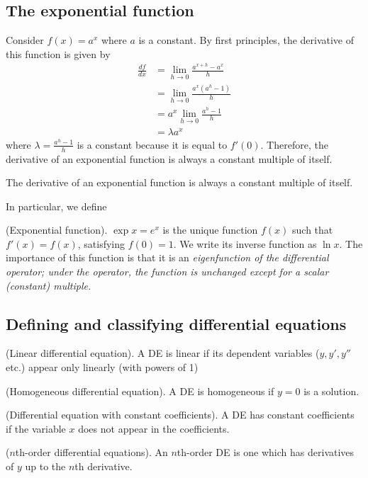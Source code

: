\documentclass{article}
\begin{document}
\subsection{The exponential function}
Consider $f(x) = a^x$ where $a$ is a constant. By first principles, the derivative of this function is given by
\begin{equation*}
    \begin{aligned}
    \frac{df}{dx} &= \lim_{h \to 0} \frac{a^{x+h}-a^x}{h}\\
    &= \lim_{h \to 0} \frac{a^{x}(a^h-1)}{h}\\
    &= a^x \lim_{h \to 0}\frac{a^h-1}{h} \\
    &= \lambda a^x
    \end{aligned}
\end{equation*}
where $\lambda = \frac{a^h-1}{h}$ is a constant because it is equal to $f'(0)$. Therefore, the derivative of an exponential function is always a constant multiple of itself.
\begin{principle}
    The derivative of an exponential function is always a constant multiple of itself.
\end{principle}
In particular, we define
\begin{definition}
    (Exponential function). $\exp{x}=e^x$ is the unique function $f(x)$ such that $f'(x)=f(x)$, satisfying $f(0)=1$. We write its inverse function as $\ln x$. The importance of this function is that it is an \it eigenfunction \normalfont of the differential operator; under the operator, the function is unchanged except for a scalar (constant) multiple.
\end{definition}
\subsection{Defining and classifying differential equations}
\begin{definition}
    (Linear differential equation). A DE is linear if its dependent variables ($y, y', y''$ etc.) appear only linearly (with powers of 1)
\end{definition}
\begin{definition}
    (Homogeneous differential equation). A DE is homogeneous if $y=0$ is a solution.
\end{definition}
\begin{definition}
    (Differential equation with constant coefficients). A DE has constant coefficients if the variable $x$ does not appear in the coefficients.
\end{definition}
\begin{definition}
    ($n$th-order differential equations). An $n$th-order DE is one which has derivatives of $y$ up to the $n$th derivative.
\end{definition}
\end{document}
